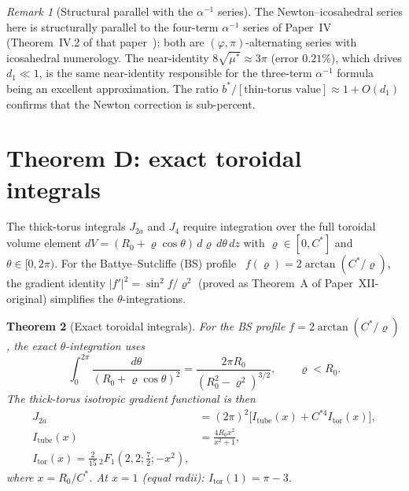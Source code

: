 \documentclass[11pt,a4paper]{article}
\newtheorem{theorem}{Theorem}[section]
\theoremstyle{definition}
\theoremstyle{remark}
\newtheorem{remark}[theorem]{Remark}
\newcommand{\vp}{\varphi}
\newcommand{\Ja}{J_{2a}}
\newcommand{\Jfour}{J_{4}}
\newcommand{\ms}{\mu^{*}}
\newcommand{\bsF}{{}_2F_1}
\begin{document}
\begin{remark}[Structural parallel with the $\alpha^{-1}$ series]
\label{P12:rem:alpha_parallel}
The Newton--icosahedral series here is structurally parallel to
the four-term $\alpha^{-1}$ series of Paper~IV~\cite{Paper4}
(Theorem~IV.2 of that paper~\cite{Paper4}):
both are $(\vp,\pi)$-alternating series with icosahedral numerology.
The near-identity $8\sqrt{\ms}\approx3\pi$ (error $0.21\%$),
which drives $d_1\ll1$, is the same near-identity responsible for
the three-term $\alpha^{-1}$ formula being an excellent approximation.
The ratio $b^*/[\text{thin-torus value}]\approx1+O(d_1)$ confirms
that the Newton correction is sub-percent.
\end{remark}

\section{Theorem D: exact toroidal integrals}
\label{P12:sec:D}

The thick-torus integrals $\Ja$ and $\Jfour$ require integration
over the full toroidal volume element
$dV = (R_0+\varrho\cos\theta)\,d\varrho\,d\theta\,dz$
with $\varrho\in[0,C^*]$ and $\theta\in[0,2\pi)$.
For the Battye--Sutcliffe (BS) profile~\cite{Battye1998}
$f(\varrho)=2\arctan(C^*/\varrho)$, the gradient identity
$|f'|^2=\sin^2\!f/\varrho^2$ (proved as Theorem~A of
Paper~XII-original) simplifies the $\theta$-integrations.

\begin{theorem}[Exact toroidal integrals]
\label{P12:thm:D}
For the BS profile $f=2\arctan(C^*/\varrho)$,
the exact $\theta$-integration uses
\begin{equation}
  \int_0^{2\pi}\frac{d\theta}{(R_0+\varrho\cos\theta)^2}
  = \frac{2\pi R_0}{(R_0^2-\varrho^2)^{3/2}},
  \qquad \varrho < R_0.
  \label{P12:eq:theta_exact}
\end{equation}
The thick-torus isotropic gradient functional is then
\begin{align}
  \Ja &= (2\pi)^2\bigl[I_{\mathrm{tube}}(x)+ C^{*4}I_{\mathrm{tor}}(x)\bigr],
  \label{P12:eq:J2a_thick}\\
  I_{\mathrm{tube}}(x) &= \frac{4R_0 x^2}{x^2+1},
  \label{P12:eq:I_tube}\\
  \boxed{
  I_{\mathrm{tor}}(x) = \frac{2}{15}\,\bsF\!\left(2,2;\tfrac{7}{2};-x^2\right),
  }
  \label{P12:eq:Itor}
\end{align}
where $x=R_0/C^*$.
At $x=1$ (equal radii): $I_{\mathrm{tor}}(1)=\pi-3$.
\end{theorem}
\end{document}
